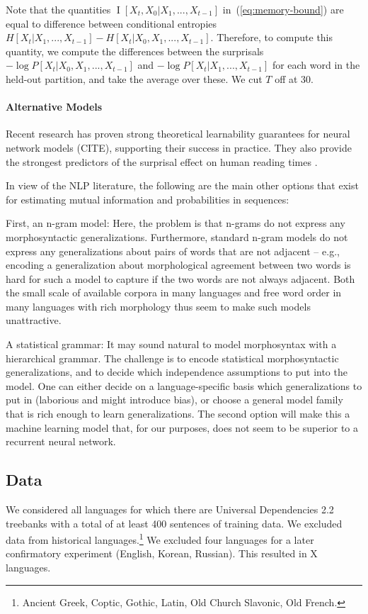 \documentclass[11pt,letterpaper]{article}
\begin{document}
Note that the quantities $\operatorname{I}[X_t, X_0 | X_1, ..., X_{t-1}]$ in~(\ref{eq:memory-bound}) are equal to difference between conditional entropies $H[X_t|X_1, ..., X_{t-1}] - H[X_t|X_0, X_1, ..., X_{t-1}]$.
Therefore, to compute this quantity, we compute the differences between the surprisals
$-\log P[X_t | X_0, X_1, ..., X_{t-1}]$ and $-\log P[X_t | X_1, ..., X_{t-1}]$ for each word in the held-out partition, and take the average over these.
We cut $T$ off at 30.



\paragraph{Alternative Models}
Recent research has proven strong theoretical learnability guarantees for neural network models (CITE), supporting their success in practice.
They also provide the strongest predictors of the surprisal effect on human reading times \citep{frank-insensitivity-2011, goodkind-predictive-2018}.

In view of the NLP literature, the following are the main other options that exist for estimating mutual information and probabilities in sequences:

First, an n-gram model: Here, the problem is that n-grams do not express any morphosyntactic generalizations. Furthermore, standard n-gram models do not express any generalizations about pairs of words that are not adjacent -- e.g., encoding a generalization about morphological agreement between two words is hard for such a model to capture if the two words are not always adjacent. Both the small scale of available corpora in many languages and free word order in many languages with rich morphology thus seem to make such models unattractive.

A statistical grammar: It may sound natural to model morphosyntax with a hierarchical grammar. The challenge is to encode statistical morphosyntactic generalizations, and to decide which independence assumptions to put into the model. One can either decide on a language-specific basis which generalizations to put in (laborious and might introduce bias), or choose a general model family that is rich enough to learn generalizations. The second option will make this a machine learning model that, for our purposes, does not seem to be superior to a recurrent neural network.




\subsection{Data}
We considered all languages for which there are Universal Dependencies 2.2 treebanks with a total of at least 400 sentences of training data.
We excluded data from historical languages.\footnote{Ancient Greek, Coptic, Gothic, Latin, Old Church Slavonic, Old French.}
We excluded four languages for a later confirmatory experiment (English, Korean, Russian). %
This resulted in X languages.
\end{document}
